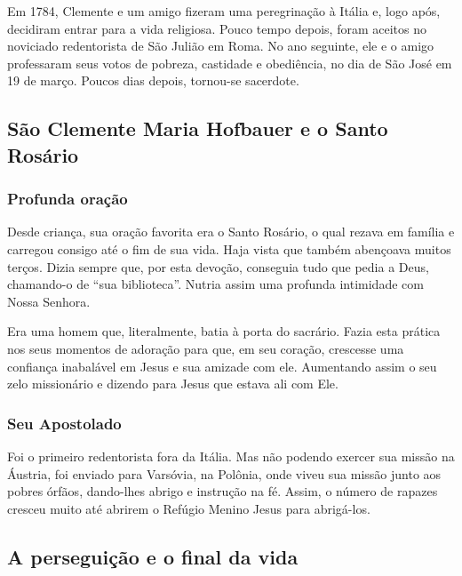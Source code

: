 \documentclass[18pt]{article}
\begin{document}
\begin{justify}
Em 1784, Clemente e um amigo fizeram uma peregrinação à Itália e, logo após, decidiram entrar para a vida religiosa. Pouco tempo depois, foram aceitos no noviciado redentorista de São Julião em Roma. No ano seguinte, ele e o amigo professaram seus votos de pobreza, castidade e obediência, no dia de São José em 19 de março. Poucos dias depois, tornou-se sacerdote.


\begin{justify}
 \subsection{São Clemente Maria Hofbauer e o Santo Rosário}
\end{justify}

\begin{justify}
 \subsubsection{Profunda oração}
\end{justify}

Desde criança, sua oração favorita era o Santo Rosário, o qual rezava em família e carregou consigo até o fim de sua vida. Haja vista que também abençoava muitos terços. Dizia sempre que, por esta devoção, conseguia tudo que pedia a Deus, chamando-o de “sua biblioteca”. Nutria assim uma profunda intimidade com Nossa Senhora.

Era uma homem que, literalmente, batia à porta do sacrário. Fazia esta prática nos seus momentos de adoração para que, em seu coração, crescesse uma confiança inabalável em Jesus e sua amizade com ele. Aumentando assim o seu zelo missionário e dizendo para Jesus que estava ali com Ele.

\begin{justify}
 \subsubsection{Seu Apostolado}
\end{justify}

Foi o primeiro redentorista fora da Itália. Mas não podendo exercer sua missão na Áustria, foi enviado para Varsóvia, na Polônia, onde viveu sua missão junto aos pobres órfãos, dando-lhes abrigo e instrução na fé. Assim, o número de rapazes cresceu muito até abrirem o Refúgio Menino Jesus para abrigá-los.


\begin{justify}
 \subsection{A perseguição e o final da vida }
\end{justify}



\end{justify}
\end{document}
